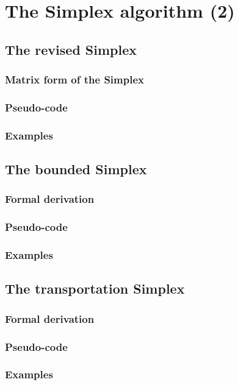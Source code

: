 \chapter{The Simplex algorithm (2)}

\section{The revised Simplex}
\subsection{Matrix form of the Simplex}
\subsection{Pseudo-code}
\subsection{Examples}

\section{The bounded Simplex}
\subsection{Formal derivation}
\subsection{Pseudo-code}
\subsection{Examples}

\section{The transportation Simplex}
\subsection{Formal derivation}
\subsection{Pseudo-code}
\subsection{Examples}
